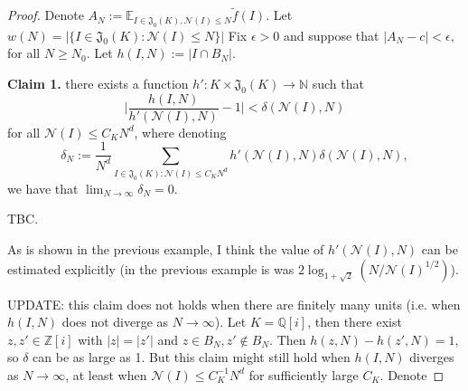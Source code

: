 \documentclass[11pt]{amsart}
\theoremstyle{definition}
\newcommand{\N}{{\mathbb N}}
\newcommand{\NN}{{\mathcal N}}
\newcommand{\Q}{{\mathbb Q}}
\newcommand{\Z}{{\mathbb Z}}
\newcommand{\e}{\epsilon}
\begin{document}
\begin{proof}
Denote $A_{N}:=\mathbb{E}_{I\in\mathfrak{J}_{0}(K),\NN(I)\leq N}\tilde{f}(I)$. Let $w(N)=\vert\{I\in\mathfrak{J}_{0}(K)\colon\NN(I)\leq N\}\vert$ 
     Fix $\e>0$ and suppose that 
    $\vert A_{N}-c\vert<\e,$
    for all $N\geq N_{0}$. Let  $h(I,N):=\vert I \cap B_{N}\vert$. 

\textbf{Claim 1.} there exists a function $h'\colon K\times \mathfrak{J}_{0}(K)\to\N$ such that 
$$\vert \frac{h(I,N)}{h'(\NN(I),N)}-1\vert<\delta(\NN(I),N)$$
for all $\NN(I)\leq C_{K}N^{d}$, where denoting $$\delta_{N}:=\frac{1}{N^{d}}\sum_{I\in\mathfrak{J}_{0}(K)\colon\NN(I)\leq C_{K}N^{d}}h'(\NN(I),N)\delta(\NN(I),N),$$
we have that $\lim_{N\to\infty}\delta_{N}=0$.


{\color{red} TBC.}

{\color{red} As is shown in the previous example, I think the value of $h'(\NN(I),N)$ can be estimated explicitly (in the previous example is was $2\log_{1+\sqrt{2}}(N/\NN(I)^{1/2})$). }

{\color{red} UPDATE:  this claim does not holds when there are finitely many units (i.e. when $h(I,N)$ does not diverge as $N\to\infty$). Let $K=\Q[i]$, then there exist  $z,z'\in\Z[i]$ with $\vert z\vert=\vert z'\vert$ and $z\in B_{N}, z'\notin B_{N}$. Then $h(z,N)-h(z',N)=1$, so $\delta$ can be as large as 1. But this claim might still hold when $h(I,N)$  diverges as $N\to\infty$, at least when $\NN(I)\leq C_{K}^{-1}N^{d}$ for sufficiently large $C_{K}$.}
Denote 
 

\end{proof}
\end{document}
